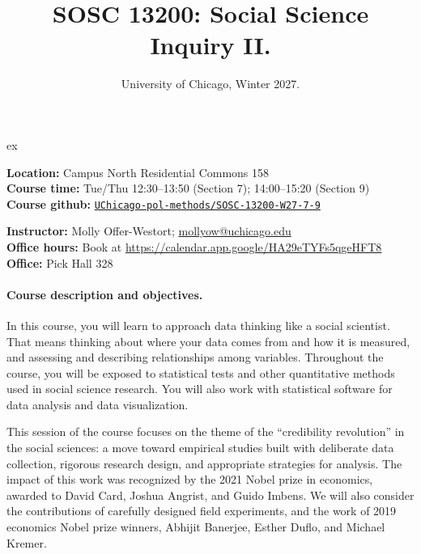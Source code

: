 \documentclass[letterpaper, 12pt, parskip=full,DIV=10]{scrartcl}
\title{SOSC 13200: Social Science Inquiry II.}
\subtitle{University of Chicago, Winter 2027.}
\begin{document}
\maketitle

 ex

\textbf{Location:} Campus North Residential Commons 158\\
\textbf{Course time:} Tue/Thu 12:30--13:50 (Section 7); 14:00--15:20 (Section 9)\\
\textbf{Course github:} \href{https://github.com/UChicago-pol-methods/SOSC-13200-W27-7-9}{\texttt{UChicago-pol-methods/SOSC-13200-W27-7-9}}

\textbf{Instructor:} Molly Offer-Westort; \href{mailto:mollyow@uchicago.edu}{mollyow@uchicago.edu}\\
\textbf{Office hours:} Book at \url{https://calendar.app.google/HA29eTYFs5qgeHFT8}\\
\textbf{Office:} Pick Hall 328

\paragraph{Course description and objectives.}
In this course, you will learn to approach data thinking like a social scientist.
That means thinking about where your data comes from and how it is measured, and assessing and describing relationships among variables.
Throughout the course, you will be exposed to statistical tests and other quantitative methods used in social science research.
You will also work with statistical software for data analysis and data visualization.

This session of the course focuses on the theme of the ``credibility revolution'' in the social sciences:
a move toward empirical studies built with deliberate data collection, rigorous research design, and appropriate strategies for analysis.
The impact of this work was recognized by the 2021 Nobel prize in economics, awarded to David Card, Joshua Angrist, and Guido Imbens.
We will also consider the contributions of carefully designed field experiments, and the work of 2019 economics Nobel prize winners, Abhijit Banerjee, Esther Duflo, and Michael Kremer.

\end{document}
